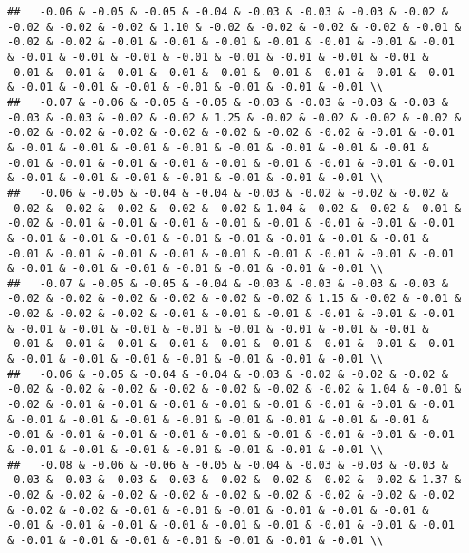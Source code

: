 \documentclass[
]{article}
\begin{document}
\begin{verbatim}
##   -0.06 & -0.05 & -0.05 & -0.04 & -0.03 & -0.03 & -0.03 & -0.02 & -0.02 & -0.02 & -0.02 & 1.10 & -0.02 & -0.02 & -0.02 & -0.02 & -0.01 & -0.02 & -0.02 & -0.01 & -0.01 & -0.01 & -0.01 & -0.01 & -0.01 & -0.01 & -0.01 & -0.01 & -0.01 & -0.01 & -0.01 & -0.01 & -0.01 & -0.01 & -0.01 & -0.01 & -0.01 & -0.01 & -0.01 & -0.01 & -0.01 & -0.01 & -0.01 & -0.01 & -0.01 & -0.01 & -0.01 & -0.01 & -0.01 & -0.01 \\ 
##   -0.07 & -0.06 & -0.05 & -0.05 & -0.03 & -0.03 & -0.03 & -0.03 & -0.03 & -0.03 & -0.02 & -0.02 & 1.25 & -0.02 & -0.02 & -0.02 & -0.02 & -0.02 & -0.02 & -0.02 & -0.02 & -0.02 & -0.02 & -0.02 & -0.01 & -0.01 & -0.01 & -0.01 & -0.01 & -0.01 & -0.01 & -0.01 & -0.01 & -0.01 & -0.01 & -0.01 & -0.01 & -0.01 & -0.01 & -0.01 & -0.01 & -0.01 & -0.01 & -0.01 & -0.01 & -0.01 & -0.01 & -0.01 & -0.01 & -0.01 \\ 
##   -0.06 & -0.05 & -0.04 & -0.04 & -0.03 & -0.02 & -0.02 & -0.02 & -0.02 & -0.02 & -0.02 & -0.02 & -0.02 & 1.04 & -0.02 & -0.02 & -0.01 & -0.02 & -0.01 & -0.01 & -0.01 & -0.01 & -0.01 & -0.01 & -0.01 & -0.01 & -0.01 & -0.01 & -0.01 & -0.01 & -0.01 & -0.01 & -0.01 & -0.01 & -0.01 & -0.01 & -0.01 & -0.01 & -0.01 & -0.01 & -0.01 & -0.01 & -0.01 & -0.01 & -0.01 & -0.01 & -0.01 & -0.01 & -0.01 & -0.01 \\ 
##   -0.07 & -0.05 & -0.05 & -0.04 & -0.03 & -0.03 & -0.03 & -0.03 & -0.02 & -0.02 & -0.02 & -0.02 & -0.02 & -0.02 & 1.15 & -0.02 & -0.01 & -0.02 & -0.02 & -0.02 & -0.01 & -0.01 & -0.01 & -0.01 & -0.01 & -0.01 & -0.01 & -0.01 & -0.01 & -0.01 & -0.01 & -0.01 & -0.01 & -0.01 & -0.01 & -0.01 & -0.01 & -0.01 & -0.01 & -0.01 & -0.01 & -0.01 & -0.01 & -0.01 & -0.01 & -0.01 & -0.01 & -0.01 & -0.01 & -0.01 \\ 
##   -0.06 & -0.05 & -0.04 & -0.04 & -0.03 & -0.02 & -0.02 & -0.02 & -0.02 & -0.02 & -0.02 & -0.02 & -0.02 & -0.02 & -0.02 & 1.04 & -0.01 & -0.02 & -0.01 & -0.01 & -0.01 & -0.01 & -0.01 & -0.01 & -0.01 & -0.01 & -0.01 & -0.01 & -0.01 & -0.01 & -0.01 & -0.01 & -0.01 & -0.01 & -0.01 & -0.01 & -0.01 & -0.01 & -0.01 & -0.01 & -0.01 & -0.01 & -0.01 & -0.01 & -0.01 & -0.01 & -0.01 & -0.01 & -0.01 & -0.01 \\ 
##   -0.08 & -0.06 & -0.06 & -0.05 & -0.04 & -0.03 & -0.03 & -0.03 & -0.03 & -0.03 & -0.03 & -0.03 & -0.02 & -0.02 & -0.02 & -0.02 & 1.37 & -0.02 & -0.02 & -0.02 & -0.02 & -0.02 & -0.02 & -0.02 & -0.02 & -0.02 & -0.02 & -0.02 & -0.01 & -0.01 & -0.01 & -0.01 & -0.01 & -0.01 & -0.01 & -0.01 & -0.01 & -0.01 & -0.01 & -0.01 & -0.01 & -0.01 & -0.01 & -0.01 & -0.01 & -0.01 & -0.01 & -0.01 & -0.01 & -0.01 \\ 

\end{verbatim}
\end{document}
